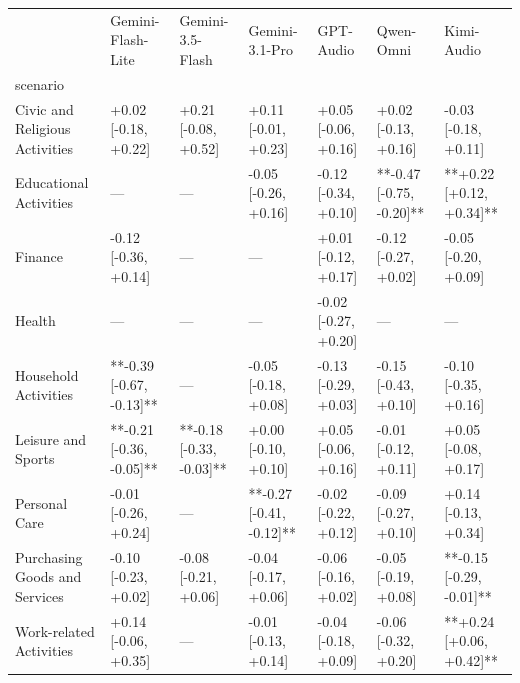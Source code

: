 \begin{tabular}{lllllll}
\toprule
 & Gemini-Flash-Lite & Gemini-3.5-Flash & Gemini-3.1-Pro & GPT-Audio & Qwen-Omni & Kimi-Audio \\
scenario &  &  &  &  &  &  \\
\midrule
Civic and Religious Activities & +0.02 [-0.18, +0.22] & +0.21 [-0.08, +0.52] & +0.11 [-0.01, +0.23] & +0.05 [-0.06, +0.16] & +0.02 [-0.13, +0.16] & -0.03 [-0.18, +0.11] \\
Educational Activities & — & — & -0.05 [-0.26, +0.16] & -0.12 [-0.34, +0.10] & **-0.47 [-0.75, -0.20]** & **+0.22 [+0.12, +0.34]** \\
Finance & -0.12 [-0.36, +0.14] & — & — & +0.01 [-0.12, +0.17] & -0.12 [-0.27, +0.02] & -0.05 [-0.20, +0.09] \\
Health & — & — & — & -0.02 [-0.27, +0.20] & — & — \\
Household Activities & **-0.39 [-0.67, -0.13]** & — & -0.05 [-0.18, +0.08] & -0.13 [-0.29, +0.03] & -0.15 [-0.43, +0.10] & -0.10 [-0.35, +0.16] \\
Leisure and Sports & **-0.21 [-0.36, -0.05]** & **-0.18 [-0.33, -0.03]** & +0.00 [-0.10, +0.10] & +0.05 [-0.06, +0.16] & -0.01 [-0.12, +0.11] & +0.05 [-0.08, +0.17] \\
Personal Care & -0.01 [-0.26, +0.24] & — & **-0.27 [-0.41, -0.12]** & -0.02 [-0.22, +0.12] & -0.09 [-0.27, +0.10] & +0.14 [-0.13, +0.34] \\
Purchasing Goods and Services & -0.10 [-0.23, +0.02] & -0.08 [-0.21, +0.06] & -0.04 [-0.17, +0.06] & -0.06 [-0.16, +0.02] & -0.05 [-0.19, +0.08] & **-0.15 [-0.29, -0.01]** \\
Work-related Activities & +0.14 [-0.06, +0.35] & — & -0.01 [-0.13, +0.14] & -0.04 [-0.18, +0.09] & -0.06 [-0.32, +0.20] & **+0.24 [+0.06, +0.42]** \\
\bottomrule
\end{tabular}

